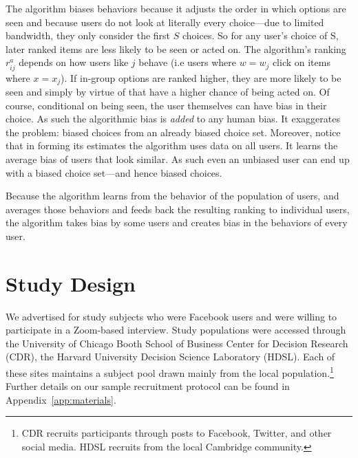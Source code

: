 \documentclass[12pt,letterpaper]{article}
\begin{document}
The algorithm biases behaviors because it adjusts the order in which options are seen and because users do not look at literally every choice---due to limited bandwidth, they only consider the first $S$ choices. So for any user's choice of S, later ranked items are less likely to be seen or acted on. The algorithm's ranking $r_{ij}^a$ depends on how users like $j$ behave (i.e users where $w =w_j$ click on items where $x=x_j$). If in-group options are ranked higher, they are more likely to be seen and simply by virtue of that have a higher chance of being acted on. Of course, conditional on being seen, the user themselves can have bias in their choice. As such the algorithmic bias is {\em added} to any human bias. It exaggerates the problem: biased choices from an already biased choice set. Moreover, notice that in forming its estimates the algorithm uses data on all users. It learns the average bias of users that look similar. As such even an unbiased user can end up with a biased choice set---and hence biased choices. 

Because the algorithm learns from the behavior of the population of users, and averages those behaviors and feeds back the resulting ranking to individual users, the algorithm takes bias by some users and creates bias in the behaviors of every user.


\section{Study Design} 

We advertised for study subjects who were Facebook users and were willing to participate in a Zoom-based interview. Study populations were accessed through the University of Chicago Booth School of Business Center for Decision Research (CDR), the Harvard University Decision Science Laboratory (HDSL).  Each of these sites maintains a subject pool drawn mainly from the local population.\footnote{CDR recruits participants through posts to Facebook, Twitter, and other social media. HDSL recruits from the local Cambridge community.} Further details on our sample recruitment protocol can be found in Appendix~\ref{app:materials}.
\end{document}
